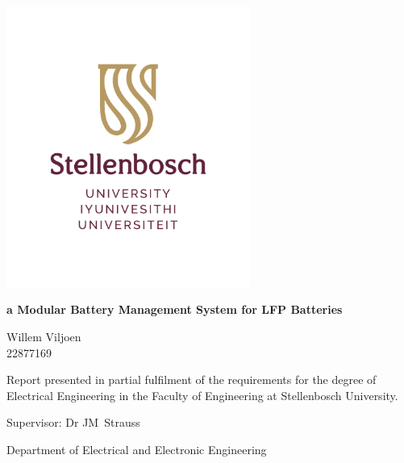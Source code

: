 \graphicspath{{frontmatter/fig/}}

\begin{titlepage}
\begin{center}

\includegraphics[width=8cm]{frontmatter/fig/SU_logo_RGB_without_slogan.pdf}

\vfill

		{\sffamily \bfseries \huge a Modular Battery Management System for LFP Batteries \par}
		
		\vspace{7em}
		
		{\large {\Large  Willem Viljoen} \\ 22877169 \par}

		
		\vspace{8em}
		
		{Report presented in partial fulfilment of the requirements for the degree of Electrical Engineering in the Faculty of Engineering at Stellenbosch University. \par}
		
		\vfill
  
        {\large {Supervisor}: Dr JM\ Strauss \par}		
		{Department of Electrical and Electronic Engineering \par}

\vfill



\vfill

{\Large \myDate}
\end{center}
\end{titlepage}
